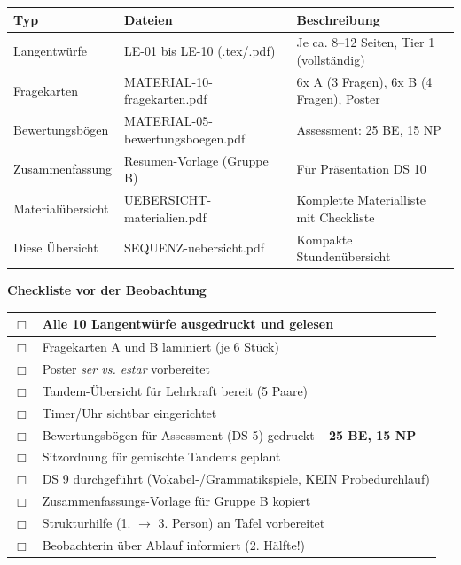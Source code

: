 \documentclass[11pt, a4paper]{article}
\newcommand{\es}[1]{\textcolor{spanisch}{\textit{#1}}}
\begin{document}
\begin{tabular}{@{}p{4cm}p{5cm}p{6cm}@{}}
\textbf{Typ} & \textbf{Dateien} & \textbf{Beschreibung} \\
\hline
Langentwürfe & LE-01 bis LE-10 (.tex/.pdf) & Je ca. 8--12 Seiten, Tier 1 (vollständig) \\
Fragekarten & MATERIAL-10-fragekarten.pdf & 6x A (3 Fragen), 6x B (4 Fragen), Poster \\
Bewertungsbögen & MATERIAL-05-bewertungsboegen.pdf & Assessment: 25 BE, 15 NP \\
Zusammenfassung & Resumen-Vorlage (Gruppe B) & Für Präsentation DS 10 \\
Materialübersicht & UEBERSICHT-materialien.pdf & Komplette Materialliste mit Checkliste \\
Diese Übersicht & SEQUENZ-uebersicht.pdf & Kompakte Stundenübersicht \\
\end{tabular}

\vspace{0.5cm}


{\large\bfseries\color{spanisch} Checkliste vor der Beobachtung}

\vspace{0.3cm}

\begin{tabular}{|p{0.5cm}|p{14cm}|}
\hline
$\Box$ & Alle 10 Langentwürfe ausgedruckt und gelesen \\
\hline
$\Box$ & Fragekarten A und B laminiert (je 6 Stück) \\
\hline
$\Box$ & Poster \es{ser vs. estar} vorbereitet \\
\hline
$\Box$ & Tandem-Übersicht für Lehrkraft bereit (5 Paare) \\
\hline
$\Box$ & Timer/Uhr sichtbar eingerichtet \\
\hline
$\Box$ & Bewertungsbögen für Assessment (DS 5) gedruckt -- \textbf{25 BE, 15 NP} \\
\hline
$\Box$ & Sitzordnung für gemischte Tandems geplant \\
\hline
$\Box$ & DS 9 durchgeführt (Vokabel-/Grammatikspiele, KEIN Probedurchlauf) \\
\hline
$\Box$ & Zusammenfassungs-Vorlage für Gruppe B kopiert \\
\hline
$\Box$ & Strukturhilfe (1. $\rightarrow$ 3. Person) an Tafel vorbereitet \\
\hline
$\Box$ & Beobachterin über Ablauf informiert (2. Hälfte!) \\
\hline
\end{tabular}
\end{document}

